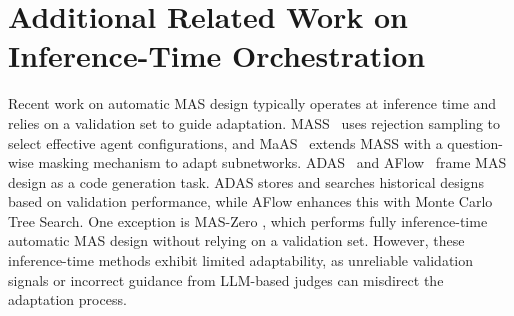 \section{Additional Related Work on Inference-Time Orchestration}
\label{ap:related}

Recent work on automatic MAS design typically operates at inference time and relies on a validation set to guide adaptation.  MASS~\citep{zhou2025multiagentdesignoptimizingagents} uses rejection sampling to select effective agent configurations, and MaAS~\citep{zhang2025multiagentarchitecturesearchagentic} extends MASS with a question-wise masking mechanism to adapt subnetworks. ADAS~\citep{hu2025automated} and AFlow~\citep{zhang2024aflowautomatingagenticworkflow} frame MAS design as a code generation task. ADAS stores and searches historical designs based on validation performance, while AFlow enhances this with Monte Carlo Tree Search. One exception is MAS-Zero \citep{Ke2025MASZero}, which performs fully inference-time automatic MAS design without relying on a validation set. However, these inference-time methods exhibit limited adaptability, as unreliable validation signals or incorrect guidance from LLM-based judges can misdirect the adaptation process.